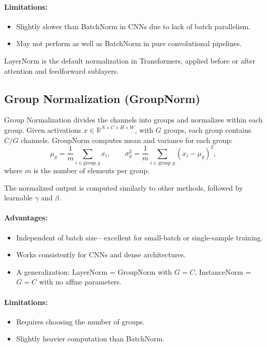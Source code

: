 \documentclass[12pt,a4paper]{report}
\begin{document}
\paragraph{Limitations:}
\begin{itemize}
    \item Slightly slower than BatchNorm in CNNs due to lack of batch parallelism.
    \item May not perform as well as BatchNorm in pure convolutional pipelines.
\end{itemize}

LayerNorm is the default normalization in Transformers, applied before or after attention and feedforward sublayers.

\vspace{1em}
\subsection{Group Normalization (GroupNorm)}

Group Normalization divides the channels into groups and normalizes within each group.  
Given activations $x \in \mathbb{R}^{N \times C \times H \times W}$, with $G$ groups, each group contains $C/G$ channels.  
GroupNorm computes mean and variance for each group:
\[
\mu_g = \frac{1}{m} \sum_{i \in \text{group } g} x_i,
\qquad
\sigma_g^2 = \frac{1}{m} \sum_{i \in \text{group } g} (x_i - \mu_g)^2,
\]
where $m$ is the number of elements per group.

The normalized output is computed similarly to other methods, followed by learnable $\gamma$ and $\beta$.

\paragraph{Advantages:}
\begin{itemize}
    \item Independent of batch size—excellent for small-batch or single-sample training.
    \item Works consistently for CNNs and dense architectures.
    \item A generalization: LayerNorm = GroupNorm with $G = C$, InstanceNorm = $G = C$ with no affine parameters.
\end{itemize}

\paragraph{Limitations:}
\begin{itemize}
    \item Requires choosing the number of groups.
    \item Slightly heavier computation than BatchNorm.
\end{itemize}
\end{document}
